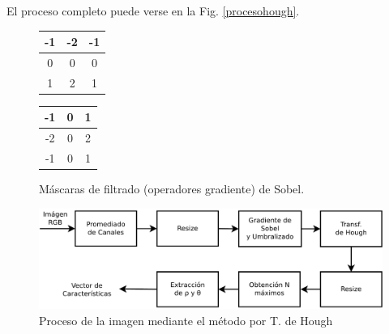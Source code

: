 \documentclass[conference,spanish,a4paper,10pt,oneside,final]{tfmpd}
\begin{document}
El proceso completo puede verse en la Fig. \ref{procesohough}.
\begin{figure}
\begin{center}
\begin{tabular}{|c|c|c|}
\hline -1 & -2 & -1 \\\hline 0 & 0 & 0 \\\hline 1 & 2 & 1 \\\hline
\end{tabular}
\begin{tabular}{|c|c|c|}
\hline -1 & 0 & 1 \\\hline -2 & 0 & 2 \\\hline -1 & 0 & 1 \\\hline
\end{tabular}
\end{center}
\caption{Máscaras de filtrado (operadores gradiente) de Sobel.}
\label{masksobel}
\end{figure}


%

%
%
\begin{figure}
\begin{center}
\includegraphics[scale=0.25]{../diagramas/procesohough} 
\end{center}
\caption{Proceso de la imagen mediante el método por T. de Hough}
\label{procesoestadisticas}
\end{figure}
%
%
\end{document}
